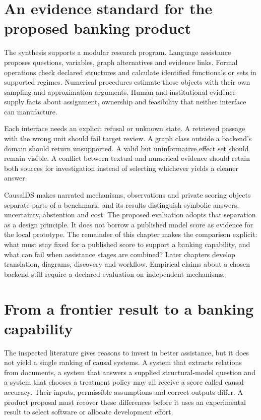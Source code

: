 \section{An evidence standard for the proposed banking product}

The synthesis supports a modular research program. Language assistance proposes
questions, variables, graph alternatives and evidence links. Formal operations
check declared structures and calculate identified functionals or sets in
supported regimes. Numerical procedures estimate those objects with their own
sampling and approximation arguments. Human and institutional evidence supply
facts about assignment, ownership and feasibility that neither interface can
manufacture.

Each interface needs an explicit refusal or unknown state. A retrieved passage
with the wrong unit should fail target review. A graph class outside a backend's
domain should return unsupported. A valid but uninformative effect set should
remain visible. A conflict between textual and numerical evidence should retain
both sources for investigation instead of selecting whichever yields a cleaner
answer.

CausalDS makes narrated mechanisms, observations and private scoring objects
separate parts of a benchmark, and its results distinguish symbolic answers,
uncertainty, abstention and cost. \citep{v12_la_2607_08093} The proposed evaluation
adopts that separation as a design principle. It does not borrow a published
model score as evidence for the local prototype. The remainder of this chapter
makes the comparison explicit: what must stay fixed for a published score to
support a banking capability, and what can fail when assistance stages are
combined? Later chapters develop translation, diagrams, discovery and workflow.
Empirical claims about a chosen backend still require a declared evaluation
on independent mechanisms.


\section{From a frontier result to a banking capability}
\label{exec13:frontier-synthesis}

The inspected literature gives reasons to invest in better assistance, but it
does not yield a single ranking of causal systems. A system that extracts
relations from documents, a system that answers a supplied structural-model
question and a system that chooses a treatment policy may all receive a score
called causal accuracy. Their inputs, permissible assumptions and correct
outputs differ. A product proposal must recover these differences before it
uses an experimental result to select software or allocate development effort.

